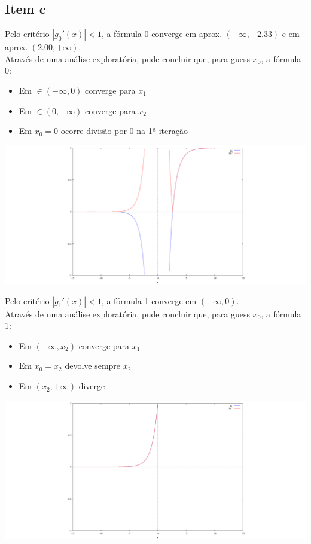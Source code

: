 {\subsection{Item c}


Pelo critério $|g_0'(x)|<1$, a fórmula 0 converge em aprox. $(-\infty,-2.33)$ e em aprox. $(2.00,+\infty)$.\\
Através de uma análise exploratória, pude concluir que, para guess $x_0$, a fórmula 0:
\begin{itemize}
	\setlength{\itemindent}{-1.5em}
	\item Em $\in (-\infty,0)$ converge para $x_1$ 
	\item Em $\in (0,+\infty)$ converge para $x_2$
	\item Em $x_0=0$ ocorre divisão por $0$ na 1ª iteração
\end{itemize}
\begin{center} \includegraphics[scale=0.2,trim={14cm 0 14cm 0},clip]{2019T1_1c0} \end{center}
Pelo critério $|g_1'(x)|<1$, a fórmula 1 converge em $(-\infty,0)$.\\
Através de uma análise exploratória, pude concluir que, para guess $x_0$, a fórmula 1:
\begin{itemize}
	\item Em $(-\infty,x_2)$ converge para $x_1$
	\item Em $x_0=x_2$ devolve sempre $x_2$
	\item Em $(x_2,+\infty)$ diverge
\end{itemize}
\begin{center} \includegraphics[scale=0.2,trim={14cm 0 14cm 0},clip]{2019T1_1c1} \end{center}

}
